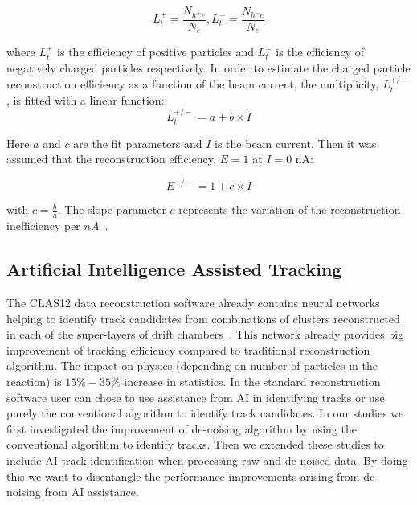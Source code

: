 \begin{equation}
L_t^+ = \frac{N_{h^+e}}{N_e} , L_t^- = \frac{N_{h^-e}}{N_e} 
\label{eq::eff}
\end{equation}

where $L_t^+$ is the efficiency of positive particles and $L_t^-$ is the efficiency of negatively
charged particles respectively. In order to estimate the charged particle reconstruction efficiency
as a function of the beam current, the multiplicity, $L_t^{+/-}$, is fitted with a linear function:
\begin{equation}
L_t^{+/-} = a + b\times I
\end{equation}

Here $a$ and $c$ are the fit parameters and $I$ is the beam current. Then it was assumed that the
reconstruction efficiency, $E=1$ at $I=0$ nA:

\begin{equation}
E^{+/-} = 1 + c \times I
\end{equation}

with $c=\frac{b}{a}$. The slope parameter $c$ represents the variation of the reconstruction
inefficiency per $nA$~\cite{Stepanyan:2020bg}.

\subsection{Artificial Intelligence Assisted Tracking}

The CLAS12 data reconstruction software already contains neural networks helping to identify track candidates from combinations of clusters reconstructed in each of the super-layers of drift chambers~\cite{Gavalian:2022mlp}.
This network already provides big improvement of tracking efficiency compared to traditional reconstruction algorithm. The impact on physics (depending on number of particles in the reaction) is $15\%-35\%$ increase in statistics. 
In the standard reconstruction software user can chose to use assistance from AI in identifying tracks or use purely the conventional algorithm to identify track candidates. In our studies we first investigated the improvement of de-noising algorithm by using the conventional algorithm to identify tracks. Then we extended these studies to include AI track identification when processing raw and de-noised data. By doing this we want to disentangle the performance improvements arising from de-noising from AI assistance. 


 
